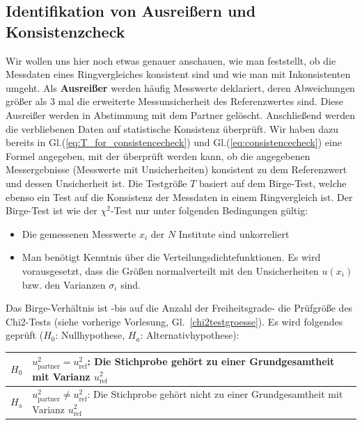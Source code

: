 \subsection{Identifikation von Ausreißern und Konsistenzcheck}
Wir wollen uns hier noch etwas genauer anschauen, wie man feststellt, 
ob die Messdaten eines Ringvergleiches konsistent sind und wie man mit Inkonsistenten umgeht.
Als \textbf{Ausreißer} werden häufig Messwerte deklariert, deren Abweichungen größer  
als 3 mal die erweiterte Messunsicherheit des Referenzwertes \cite{GuideKey} sind.
Diese Ausreißer werden in Abstimmung mit dem Partner gelöscht. 
Anschließend werden die verbliebenen Daten auf statistische Konsistenz
überprüft. Wir haben dazu bereits in Gl.(\ref{eq:T_for_consistencecheck}) und Gl.(\ref{eq:consistencecheck}) 
eine Formel angegeben, mit der überprüft werden kann, ob die angegebenen
Messergebnisse (Messwerte mit Unsicherheiten) konsistent zu dem Referenzwert und 
dessen Unsicherheit ist. Die Testgröße $T$ basiert auf dem Birge-Test, 
welche ebenso ein Test auf die Konsistenz der Messdaten in einem Ringvergleich
ist. Der Birge-Test ist wie der $\chi^2$-Test nur unter folgenden Bedingungen
gültig:
\begin{itemize}
	\item Die gemessenen Messwerte $x_i$ der $N$ Institute sind unkorreliert
	\item Man benötigt Kenntnis über die Verteilungsdichtefunktionen. Es 
	wird vorausgesetzt, dass die Größen normalverteilt mit den Unsicherheiten $u(x_i)$ bzw. den Varianzen $\sigma_i$ sind.
\end{itemize}
Das Birge-Verhältnis ist -bis auf die Anzahl der Freiheitsgrade- die Prüfgröße des Chi2-Tests
(siehe vorherige Vorlesung, Gl.~\ref{chi2testgroesse}).
Es wird folgendes geprüft ($H_0$: Nullhypothese, $H_a$: Alternativhypothese):
\begin{center}
	\begin{tabular}{l | p{14cm} }
	$H_0$	& $u_\mathrm{partner}^2 =  u_\mathrm{ref}^2$:\newline 
	Die Stichprobe gehört zu 
		einer Grundgesamtheit  mit Varianz $u_\mathrm{ref}^2$\\	\hline
 $H_\mathrm{a}$	& $u_\mathrm{partner}^2 \neq  u_\mathrm{ref}^2$: \newline 
 Die Stichprobe gehört nicht zu einer Grundgesamtheit mit Varianz $u_\mathrm{ref}^2$\\ 
	\end{tabular}
\end{center}
 
